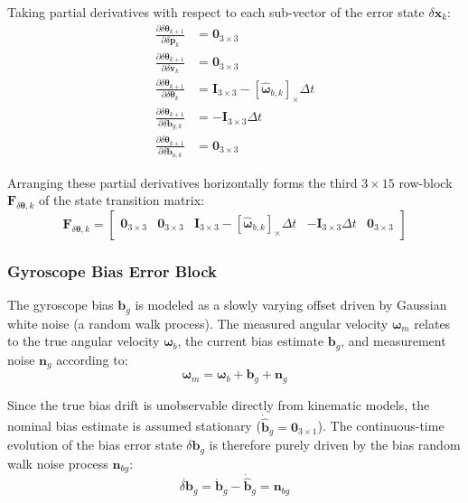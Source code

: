 \documentclass{article}
\begin{document}
	Taking partial derivatives with respect to each sub-vector of the error state $\delta\mathbf{x}_k$:
	\begin{align*}
		\frac{\partial \delta\bm{\theta}_{k+1}}{\partial \delta\mathbf{p}_k} &= \mathbf{0}_{3 \times 3} \\
		\frac{\partial \delta\bm{\theta}_{k+1}}{\partial \delta\mathbf{v}_k} &= \mathbf{0}_{3 \times 3} \\
		\frac{\partial \delta\bm{\theta}_{k+1}}{\partial \delta\bm{\theta}_k} &= \mathbf{I}_{3 \times 3} - [\hat{\bm{\omega}}_{b,k}]_\times \Delta t \\
		\frac{\partial \delta\bm{\theta}_{k+1}}{\partial \delta\mathbf{b}_{g,k}} &= -\mathbf{I}_{3 \times 3} \Delta t \\
		\frac{\partial \delta\bm{\theta}_{k+1}}{\partial \delta\mathbf{b}_{a,k}} &= \mathbf{0}_{3 \times 3}
	\end{align*}
	
	Arranging these partial derivatives horizontally forms the third $3 \times 15$ row-block $\mathbf{F}_{\delta\bm{\theta}, k}$ of the state transition matrix:
	\begin{equation*}
		\mathbf{F}_{\delta\bm{\theta}, k} = 
		\begin{bmatrix}
			\mathbf{0}_{3 \times 3} & \mathbf{0}_{3 \times 3} & \mathbf{I}_{3 \times 3} - [\hat{\bm{\omega}}_{b,k}]_\times \Delta t & -\mathbf{I}_{3 \times 3} \Delta t & \mathbf{0}_{3 \times 3}
		\end{bmatrix}
	\end{equation*}
	
	\subsubsection{Gyroscope Bias Error Block}
	The gyroscope bias $\mathbf{b}_g$ is modeled as a slowly varying offset driven by Gaussian white noise (a random walk process). The measured angular velocity $\bm{\omega}_m$ relates to the true angular velocity $\bm{\omega}_b$, the current bias estimate $\mathbf{b}_g$, and measurement noise $\mathbf{n}_g$ according to:
	\begin{equation*}
		\bm{\omega}_m = \bm{\omega}_b + \mathbf{b}_g + \mathbf{n}_g
	\end{equation*}
	
	Since the true bias drift is unobservable directly from kinematic models, the nominal bias estimate is assumed stationary ($\dot{\hat{\mathbf{b}}}_g = \mathbf{0}_{3 \times 1}$). The continuous-time evolution of the bias error state $\delta\mathbf{b}_g$ is therefore purely driven by the bias random walk noise process $\mathbf{n}_{bg}$:
	\begin{equation*}
		\dot{\delta\mathbf{b}}_g = \dot{\mathbf{b}}_g - \dot{\hat{\mathbf{b}}}_g = \mathbf{n}_{bg}
	\end{equation*}
	
\end{document}
